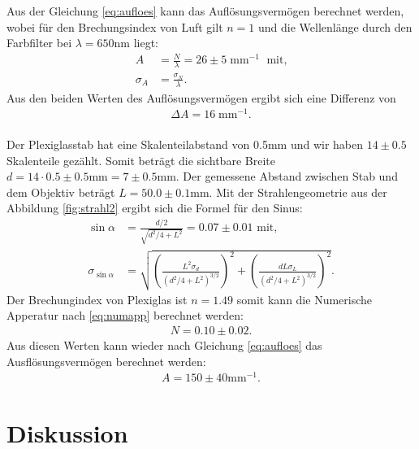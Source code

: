 \documentclass[12pt,a4paper,titlepage,headinclude]{scrartcl}
\numberwithin{equation}{subsection}
\begin{document}
Aus der Gleichung \eqref{eq:aufloes} kann das Auflösungsvermögen berechnet werden, wobei für den Brechungsindex von Luft gilt $n=1$ und die Wellenlänge durch den Farbfilter bei $\lambda=650\si{\nano\meter}$ liegt:
\begin{align}
	A&=\frac{N}{\lambda}=26\pm5 \;\text{mm}^{-1} \; \text{ mit,}\\
	\sigma_A&=\frac{\sigma_N}{\lambda}.
\end{align}
Aus den beiden Werten des Auflösungsvermögen ergibt sich eine Differenz von
\begin{align}
	\Delta A=16\;\text{mm}^{-1}.
\end{align}
\\
Der Plexiglasstab hat eine Skalenteilabstand von 0.5\si{\milli\meter} und wir haben $14\pm0.5$ Skalenteile gezählt.
Somit beträgt die sichtbare Breite $d=14\cdot0.5\pm0.5\si{\milli\meter}=7\pm0.5\si{\milli\meter}$.
Der gemessene Abstand zwischen Stab und dem Objektiv beträgt $L=50.0\pm0.1\si{\milli\meter}$.
Mit der Strahlengeometrie aus der Abbildung \ref{fig:strahl2} ergibt sich die Formel für den Sinus:
\begin{align}
	\sin{\alpha}&=\frac{d/2}{\sqrt{d^2/4+L^2}}=0.07\pm0.01 \text{ mit,}\\
	\sigma_{\sin{\alpha}}&=\sqrt{\left( \frac{L^2\sigma_d}{\left( d^2/4+L^2  \right)^{3/2}}\right)^2 + \left( \frac{dL\sigma_L}{\left( d^2/4+L^2 \right)^{3/2}} \right)^2}.
\end{align}
Der Brechungindex von Plexiglas ist $n=1.49$ somit kann die Numerische Apperatur nach \eqref{eq:numapp} berechnet werden:
\begin{align}
	N=0.10\pm0.02.
\end{align}
Aus diesen Werten kann wieder nach Gleichung \eqref{eq:aufloes} das Ausflösungsvermögen berechnet werden:
\begin{align}
	A=150\pm40 \text{mm}^{-1}.
\end{align}

\section{Diskussion}
\label{sec:diskussion}
\end{document}
